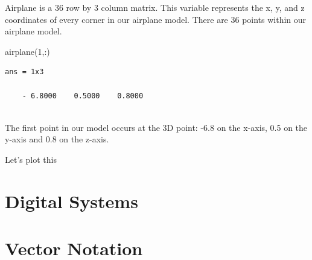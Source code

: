 \documentclass[
]{book}
\newenvironment{Shaded}{\begin{snugshade}}{\end{snugshade}}
\newcommand{\DecValTok}[1]{\textcolor[rgb]{0.00,0.00,0.81}{#1}}
\newcommand{\FunctionTok}[1]{\textcolor[rgb]{0.00,0.00,0.00}{#1}}
\newcommand{\NormalTok}[1]{#1}
\newcommand{\SpecialCharTok}[1]{\textcolor[rgb]{0.00,0.00,0.00}{#1}}
\newlength{\cslhangindent}
\newlength{\cslentryspacingunit} %
\newenvironment{CSLReferences}[2] %
 {%
  \setlength{\parindent}{0pt}
  \ifodd #1
  \let\oldpar\par
  \def\par{\hangindent=\cslhangindent\oldpar}
  \fi
  \setlength{\parskip}{#2\cslentryspacingunit}
 }%
 {}
\theoremstyle{definition}
\theoremstyle{definition}
\theoremstyle{definition}
\theoremstyle{definition}
\theoremstyle{remark}
\begin{document}
Airplane is a 36 row by 3 column matrix. This variable represents the x, y, and z coordinates of every corner in our airplane model. There are 36 points within our airplane model.

\begin{Shaded}
\begin{Highlighting}[]
\FunctionTok{airplane}\NormalTok{(}\DecValTok{1}\NormalTok{,}\SpecialCharTok{:}\NormalTok{)}
\end{Highlighting}
\end{Shaded}

\begin{verbatim}
ans = 1x3

    - 6.8000    0.5000    0.8000
    
\end{verbatim}

The first point in our model occurs at the 3D point: -6.8 on the x-axis, 0.5 on the y-axis and 0.8 on the z-axis.

Let's plot this

\hypertarget{refs}{}
\begin{CSLReferences}{0}{0}
\end{CSLReferences}

\hypertarget{appendix-appendix}{%
\appendix}


\hypertarget{digital-systems}{%
\chapter{Digital Systems}\label{digital-systems}}

\hypertarget{vector-notation}{%
\chapter{Vector Notation}\label{vector-notation}}

  
\end{document}
